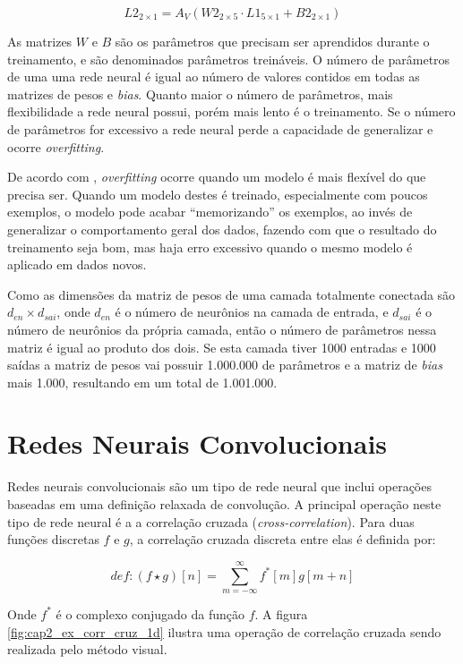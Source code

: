 \begin{equation}
	L2_{2 \times 1}=A_V \left( W2_{2 \times 5} \cdot L1_{5 \times 1}
		+ B2_{2 \times 1} \right)
\end{equation}

As matrizes $W$ e $B$ são os parâmetros que precisam ser aprendidos durante o
treinamento, e são denominados parâmetros treináveis. O número de parâmetros
de uma uma
rede neural é igual ao número de valores contidos em todas as matrizes de pesos
e \emph{bias}. Quanto maior o número de parâmetros, mais flexibilidade a rede
neural possui, porém mais lento é o treinamento. Se o número de parâmetros for
excessivo a rede neural perde a capacidade de generalizar e ocorre
\emph{overfitting}.

De acordo com \cite{hawkins2004problem}, \emph{overfitting} ocorre quando um
modelo é mais flexível do que precisa ser. Quando um modelo destes é treinado,
especialmente com poucos exemplos, o modelo pode acabar ``memorizando'' os
exemplos, ao invés de generalizar o comportamento geral dos dados, fazendo
com que o resultado do treinamento seja bom, mas haja erro excessivo
quando o mesmo modelo é aplicado em dados novos.

Como as dimensões da matriz de pesos de uma camada totalmente conectada são
$d_{en} \times d_{sai}$, onde $d_{en}$ é o número de neurônios na camada de
entrada, e $d_{sai}$ é o número de neurônios da própria camada, então o número
de parâmetros nessa matriz é igual ao produto dos dois. Se esta camada
tiver 1000 entradas e 1000 saídas a matriz de pesos vai possuir 1.000.000 de
parâmetros e a matriz de \emph{bias} mais 1.000, resultando em um total de
1.001.000.

\section{Redes Neurais Convolucionais}
Redes neurais convolucionais são um tipo de rede neural que inclui operações
baseadas em uma definição relaxada de convolução. A principal operação
neste tipo de rede neural é a a correlação cruzada (\emph{cross-correlation}).
Para duas funções discretas $f$ e $g$, a correlação cruzada discreta entre
elas é definida por:

\begin{equation}
	def: (f \star g)[n] = \sum_{m=-\infty}^{\infty} f^*[m]g[m+n]
\end{equation}

Onde $f^*$ é o complexo conjugado da função $f$. A figura
\ref{fig:cap2_ex_corr_cruz_1d} ilustra uma operação de correlação cruzada sendo
realizada pelo método visual.

